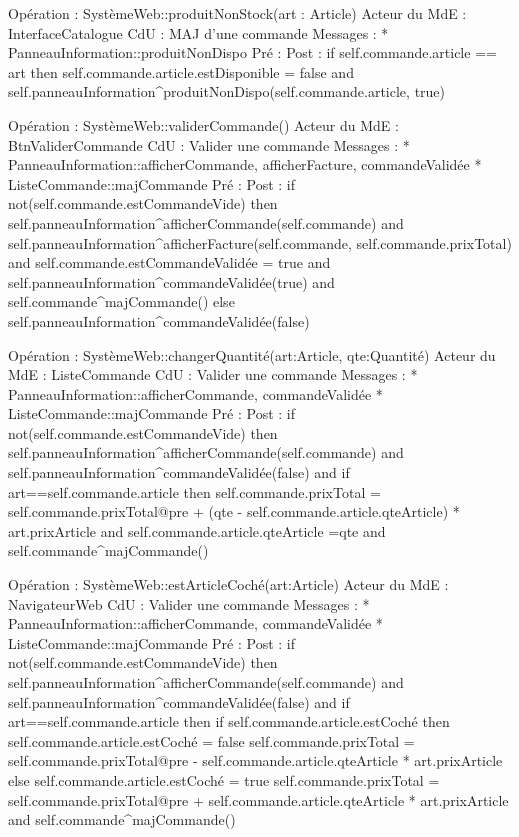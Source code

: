 Opération : SystèmeWeb::produitNonStock(art : Article)
Acteur du MdE : InterfaceCatalogue
CdU : MAJ d’une commande
Messages :
* PanneauInformation::{produitNonDispo} 
Pré :
Post :  
        if self.commande.article == art then
                self.commande.article.estDisponible = false 
and
                self.panneauInformation^produitNonDispo(self.commande.article, true)




Opération : SystèmeWeb::validerCommande()
Acteur du MdE : BtnValiderCommande
CdU : Valider une commande
Messages : 
* PanneauInformation::{afficherCommande, afficherFacture, commandeValidée}
* ListeCommande::{majCommande}
Pré :
Post :  
if not(self.commande.estCommandeVide) then
        self.panneauInformation^afficherCommande(self.commande) 
and
self.panneauInformation^afficherFacture(self.commande, 
self.commande.prixTotal) 
and
                self.commande.estCommandeValidée = true 
and 
                self.panneauInformation^commandeValidée(true) 
and
                self.commande^majCommande()
        else 
                self.panneauInformation^commandeValidée(false)




Opération : SystèmeWeb::changerQuantité(art:Article, qte:Quantité)
Acteur du MdE : ListeCommande  
CdU : Valider une commande
Messages : 
* PanneauInformation::{afficherCommande, commandeValidée}
* ListeCommande::{majCommande}
Pré :
Post :  
if not(self.commande.estCommandeVide) then
                self.panneauInformation^afficherCommande(self.commande) 
and
                self.panneauInformation^commandeValidée(false) 
and
                if art==self.commande.article then
                        self.commande.prixTotal = self.commande.prixTotal@pre + (qte - 
self.commande.article.qteArticle) * art.prixArticle
and
                        self.commande.article.qteArticle =qte
                and 
                self.commande^majCommande()
                


Opération : SystèmeWeb::estArticleCoché(art:Article)
Acteur du MdE : NavigateurWeb
CdU : Valider une commande
Messages : 
* PanneauInformation::{afficherCommande, commandeValidée}
* ListeCommande::{majCommande}
Pré :
Post :  
if not(self.commande.estCommandeVide) then
                self.panneauInformation^afficherCommande(self.commande) 
and
                self.panneauInformation^commandeValidée(false) 
and
                if art==self.commande.article then
                        if self.commande.article.estCoché then
                                self.commande.article.estCoché = false
                                self.commande.prixTotal = self.commande.prixTotal@pre - 
self.commande.article.qteArticle * art.prixArticle
                        else 
                                self.commande.article.estCoché = true
                                self.commande.prixTotal = self.commande.prixTotal@pre + 
self.commande.article.qteArticle * art.prixArticle
                        and 
                        self.commande^majCommande()




